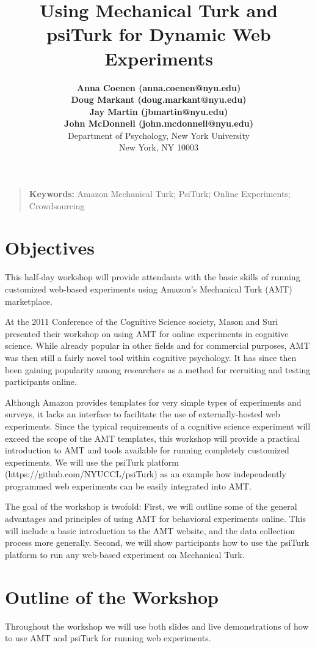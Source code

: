 \documentclass[10pt,letterpaper]{article}
\title{Using Mechanical Turk and psiTurk for Dynamic Web Experiments}
\author{{\large \bf Anna Coenen (anna.coenen@nyu.edu)} \\
 {\large \bf Doug Markant (doug.markant@nyu.edu)} \\
 {\large \bf Jay Martin (jbmartin@nyu.edu)} \\
 {\large \bf John McDonnell (john.mcdonnell@nyu.edu)} \\[1em]
  Department of Psychology,
  New York University  \\
  New York, NY 10003 \\
}
\begin{document}
\maketitle




\begin{quote}
\small
\textbf{Keywords:} 
Amazon Mechanical Turk; PsiTurk; Online Experiments; Crowdsourcing
\end{quote}

\section{Objectives}
This half-day workshop will provide attendants with the basic skills of running customized web-based experiments using Amazon's Mechanical Turk (AMT) marketplace.

At the 2011 Conference of the Cognitive Science society,  Mason and  Suri \citeyear{mason2011use} presented their workshop on using  AMT for online experiments in cognitive science. While already popular in other fields and for commercial purposes, AMT was then still a fairly novel tool  within cognitive psychology. It has since then been gaining popularity among researchers as a method for recruiting and testing participants online. 

Although Amazon provides templates for very simple types of experiments and surveys,  it lacks an interface to facilitate the use of externally-hosted web experiments.  Since the typical requirements of a cognitive science experiment will exceed the scope of the AMT templates, this workshop will provide a practical introduction to AMT and tools available for running completely customized experiments. We will use the psiTurk platform (https://github.com/NYUCCL/psiTurk) as an example how independently programmed web experiments can be easily integrated into AMT.

The goal of the workshop is twofold: First, we will outline some of the general advantages and principles of using  AMT for behavioral experiments online. This will include a basic introduction to the AMT website, and the data collection process more generally. Second, we will show participants how to use the psiTurk platform to run any web-based experiment on Mechanical Turk. 


\section{Outline of the Workshop}
Throughout the workshop we will use both slides and live demonstrations of how to use AMT and psiTurk for running web experiments. 
\end{document}
